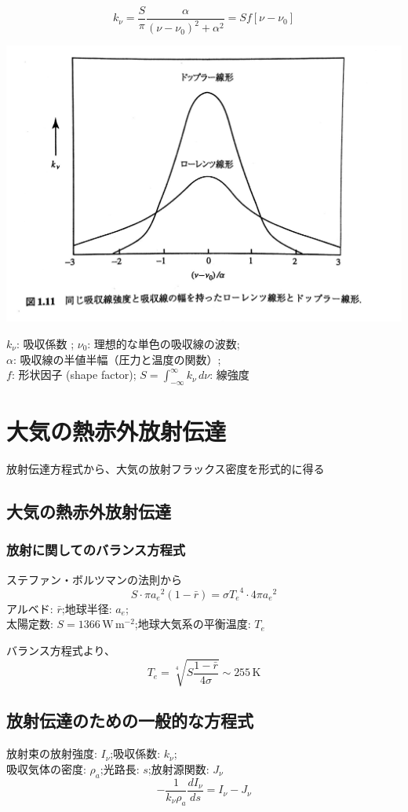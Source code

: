 \documentclass[article]{dennou777}
\newcommand{\centeralign}[1]{\rule{0pt}{0pt}\hfill#1\hfill\rule{0pt}{0pt}}
\newcommand{\Unit}[1]{\,\mathrm{#1}}
\begin{document}
\[k_\nu=\frac{S}{\pi}\frac{\alpha}{(\nu-\nu_0)^2+\alpha^2}=Sf[\nu-\nu_0]\]
\centeralign{\includegraphics[width=\textwidth]{lorentz.jpg}}

$k_\nu$: 吸収係数 ;\quad
$\nu_0$: 理想的な単色の吸収線の波数;\\
$\alpha$: 吸収線の半値半幅（圧力と温度の関数）;\\
$f$: 形状因子 (shape factor);\quad
$\displaystyle S=\int^\infty_{-\infty}k_\nu\,d\nu$: 線強度

\section{大気の熱赤外放射伝達}
放射伝達方程式から、大気の放射フラックス密度を形式的に得る

\subsection{大気の熱赤外放射伝達}
\subsubsection{放射に関してのバランス方程式}
ステファン・ボルツマンの法則から
\[S\cdot\pi{a_e}^2(1-\bar r)=\sigma{T_e}^4\cdot4\pi{a_e}^2\]
アルベド: $\bar r$;\quad 地球半径: $a_e$;\quad\\
太陽定数: $S=1366\Unit{W\,m^{-2}}$;\quad 地球大気系の平衡温度: $T_e$

バランス方程式より、
\[T_e=\sqrt[4]{S\frac{1-\bar r}{4\sigma}}\sim255\Unit{K}\]

\subsection{放射伝達のための一般的な方程式}
放射束の放射強度: $I_\nu$;\quad 吸収係数: $k_\nu$;\\
吸収気体の密度: $\rho_a$;\quad 光路長: $s$;\quad 放射源関数: $J_\nu$
\[-\frac{1}{k_\nu \rho_a}\frac{dI_\nu}{ds}=I_\nu-J_\nu\]
\end{document}
